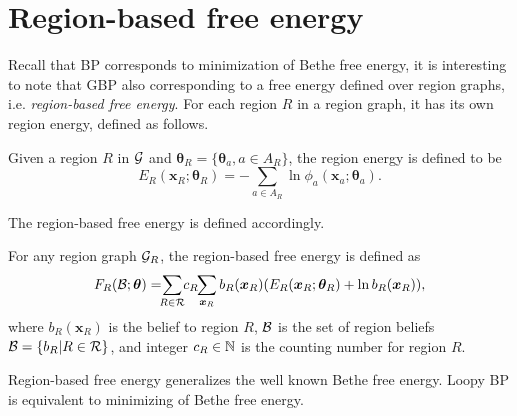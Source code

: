 \section{Region-based free energy}
Recall that BP corresponds to minimization of Bethe free energy, it is interesting to note that GBP also corresponding to a free energy defined over region graphs, i.e. \textit{region-based free energy}.
For each region $R$ in a region graph, it has its own region energy, defined as follows.
\begin{definition}
  Given a region $R$ in $\mathcal{G}$ and $\bm{\theta}_R=\{\bm{\theta}_a, a\in A_R\}$, the region energy is defined to be
  \begin{equation}
    E_R(\bm{x}_R; \bm{\theta}_R) = - \sum_{a\in A_R} \ln{\phi_a(\bm{x}_a; \bm{\theta}_a)}.
  \end{equation}
\end{definition}
The region-based free energy is defined accordingly.
\begin{definition}\label{def:region-free-energy}
  For any region graph $\mathcal{G}_R$, the region-based free energy is defined as
  \begin{equation}\label{eq:def-region-free-energy}
    F_R(\Bb; \bm{\theta}) = \hspace{-0.15cm}\sum_{R\in \Rr} \hspace{-0.1cm}c_R\hspace{-0.1cm} \sum_{\bm{x}_R}b_R(\bm{x}_R) (E_R(\bm{x}_R; \bm{\theta}_R) + \ln{b_R}(\bm{x}_R)),
  \end{equation}
  where $b_R(\bm{x}_R)$ is the belief to region $R$, $\mathcal{B}$ is the set of region beliefs $\mathcal{B} = \left\{ b_R| R \in \mathcal{R} \right\}$, and integer $c_R \in \mathbb{N}$ is the counting number for region $R$.
\end{definition}

Region-based free energy generalizes the well known Bethe free energy. Loopy BP is equivalent to minimizing of Bethe free energy.


